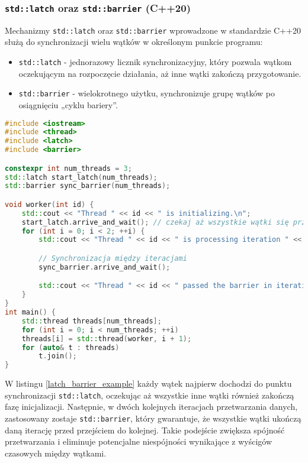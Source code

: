\subsubsection{\texttt{std::latch} oraz \texttt{std::barrier} (C++20)}
Mechanizmy \texttt{std::latch} oraz \texttt{std::barrier} wprowadzone w standardzie C++20 służą do synchronizacji wielu wątków w określonym punkcie programu:
\begin{itemize}
    \item \texttt{std::latch} - jednorazowy licznik synchronizacyjny, który pozwala wątkom oczekującym na rozpoczęcie działania, aż inne wątki zakończą przygotowanie.
    \item \texttt{std::barrier} - wielokrotnego użytku, synchronizuje grupę wątków po osiągnięciu „cyklu bariery”.
\end{itemize}
\begin{lstlisting}[language=C++, caption={Przykład użycia std::latch oraz std::barrier}, label={latch_barrier_example}]
#include <iostream>
#include <thread>
#include <latch>
#include <barrier>

constexpr int num_threads = 3;
std::latch start_latch(num_threads);
std::barrier sync_barrier(num_threads);

void worker(int id) {
    std::cout << "Thread " << id << " is initializing.\n";
    start_latch.arrive_and_wait(); // czekaj aż wszystkie wątki się przygotują
    for (int i = 0; i < 2; ++i) {
        std::cout << "Thread " << id << " is processing iteration " << i << ".\n";

        // Synchronizacja między iteracjami
        sync_barrier.arrive_and_wait();

        std::cout << "Thread " << id << " passed the barrier in iteration " << i << ".\n";
    }
}
int main() {
    std::thread threads[num_threads];
    for (int i = 0; i < num_threads; ++i)
    threads[i] = std::thread(worker, i + 1);
    for (auto& t : threads)
        t.join();
}
\end{lstlisting}    
W listingu \ref{latch_barrier_example} każdy wątek najpierw dochodzi do punktu synchronizacji \texttt{std::latch}, oczekując aż wszystkie inne wątki również zakończą fazę inicjalizacji. Następnie, w dwóch kolejnych iteracjach przetwarzania danych, zastosowany zostaje \texttt{std::barrier}, który gwarantuje, że wszystkie wątki ukończą daną iterację przed przejściem do kolejnej. Takie podejście zwiększa spójność przetwarzania i eliminuje potencjalne niespójności wynikające z wyścigów czasowych między wątkami.

